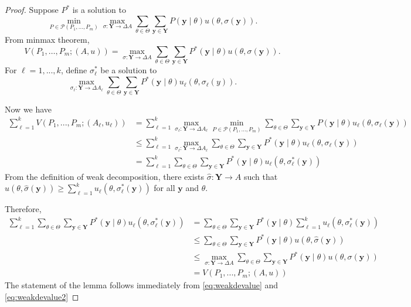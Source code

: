 \documentclass[11pt]{article}
\theoremstyle{plain}
\theoremstyle{remark}
\begin{document}
\begin{proof}

Suppose $P^*$ is a solution to 
\[\min_{P\in\mathcal{P}(P_1,...,P_m)}\max_{\sigma:\mathbf{Y}\rightarrow \Delta A}\sum_{\theta \in \Theta} \sum_{\mathbf{y} \in \mathbf{Y}} P(\mathbf{y} \mid \theta) u\left(\theta,\sigma(\mathbf{y})\right).\]
From minmax theorem, 
\[V(P_1, \ldots , P_m; (A,u))=\max_{\sigma:\mathbf{Y}\rightarrow \Delta A}\sum_{\theta \in \Theta} \sum_{\mathbf{y} \in \mathbf{Y}} P^*(\mathbf{y} \mid \theta) u\left(\theta,\sigma(\mathbf{y})\right).\]
For $\ell=1,...,k$, define $\sigma_\ell^*$ be a solution to 
\[\max_{\sigma_\ell:\mathbf{Y}\rightarrow \Delta A_\ell}\sum_{\theta \in \Theta} \sum_{\mathbf{y} \in \mathbf{Y}} P^*(\mathbf{y} \mid \theta) u_\ell(\theta,\sigma_\ell(y)).\]

Now we have
\begin{equation}\label{eq:weakdevalue}
\begin{aligned}
    \sum_{\ell = 1}^{k} V(P_1,...,P_m; (A_\ell,u_\ell))&=\sum_{\ell = 1}^{k} \max_{\sigma_\ell:\mathbf{Y}\rightarrow \Delta A_\ell} \min_{P\in\mathcal{P}(P_1,...,P_m)}\sum_{\theta \in \Theta} \sum_{\mathbf{y} \in \mathbf{Y}} P(\mathbf{y} \mid \theta) u_\ell\left(\theta,\sigma_\ell(\mathbf{y})\right)\\
    &\leq\sum_{\ell = 1}^{k} \max_{\sigma_\ell:\mathbf{Y}\rightarrow \Delta A_\ell} \sum_{\theta \in \Theta} \sum_{\mathbf{y} \in \mathbf{Y}} P^*(\mathbf{y} \mid \theta) u_\ell\left(\theta,\sigma_\ell(\mathbf{y})\right)\\
    &= \sum_{\ell = 1}^{k}  \sum_{\theta \in \Theta} \sum_{\mathbf{y} \in \mathbf{Y}} P^*(\mathbf{y} \mid \theta) u_\ell\left(\theta,\sigma_\ell^*(\mathbf{y})\right)
\end{aligned}
\end{equation}
From the definition of weak decomposition, there exists $\hat{\sigma}:\mathbf{Y}\rightarrow A$ such that $u(\theta,\hat{\sigma}(\mathbf{y}))\geq \sum_{\ell=1}^k u_\ell(\theta,\sigma^*_\ell(\mathbf{y}))$ for all $\mathbf{y}$ and $\theta.$

Therefore,
\begin{equation}\label{eq:weakdevalue2}
\begin{aligned}
    \sum_{\ell = 1}^{k}  \sum_{\theta \in \Theta} \sum_{\mathbf{y} \in \mathbf{Y}} P^*(\mathbf{y} \mid \theta) u_\ell\left(\theta,\sigma_\ell^*(\mathbf{y})\right)&= \sum_{\theta \in \Theta} \sum_{\mathbf{y} \in \mathbf{Y}} P^*(\mathbf{y} \mid \theta)  \sum_{\ell = 1}^{k} u_\ell\left(\theta,\sigma_\ell^*(\mathbf{y})\right)\\
    &\leq \sum_{\theta \in \Theta} \sum_{\mathbf{y} \in \mathbf{Y}} P^*(\mathbf{y} \mid \theta)u(\theta,\hat{\sigma}(\mathbf{y}))\\
    &\leq \max_{\sigma:\mathbf{Y}\rightarrow \Delta A}\sum_{\theta \in \Theta} \sum_{\mathbf{y} \in \mathbf{Y}} P^*(\mathbf{y} \mid \theta)u(\theta,\sigma(\mathbf{y}))\\
    &=V(P_1,...,P_m;(A,u))
\end{aligned}
\end{equation}
The statement of the lemma follows immediately from \eqref{eq:weakdevalue} and \eqref{eq:weakdevalue2}
\end{proof}
\end{document}
